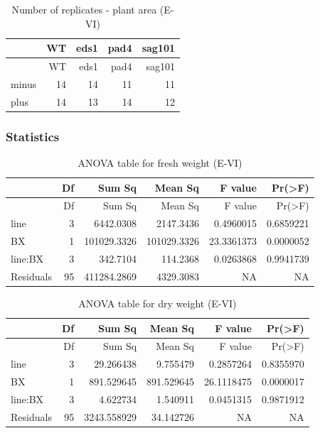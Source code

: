 \documentclass[
  10pt,
]{article}
\begin{document}
\begin{longtable}[]{@{}lrrrr@{}}
\caption{Number of replicates - plant area (E-VI)}\tabularnewline
\toprule\noalign{}
& WT & eds1 & pad4 & sag101 \\
\midrule\noalign{}
\endfirsthead
\toprule\noalign{}
& WT & eds1 & pad4 & sag101 \\
\midrule\noalign{}
\endhead
\bottomrule\noalign{}
\endlastfoot
minus & 14 & 14 & 11 & 11 \\
plus & 14 & 13 & 14 & 12 \\
\end{longtable}

\subsubsection{Statistics}\label{statistics-4}

\begin{longtable}[]{@{}lrrrrr@{}}
\caption{ANOVA table for fresh weight (E-VI)}\tabularnewline
\toprule\noalign{}
& Df & Sum Sq & Mean Sq & F value & Pr(\textgreater F) \\
\midrule\noalign{}
\endfirsthead
\toprule\noalign{}
& Df & Sum Sq & Mean Sq & F value & Pr(\textgreater F) \\
\midrule\noalign{}
\endhead
\bottomrule\noalign{}
\endlastfoot
line & 3 & 6442.0308 & 2147.3436 & 0.4960015 & 0.6859221 \\
BX & 1 & 101029.3326 & 101029.3326 & 23.3361373 & 0.0000052 \\
line:BX & 3 & 342.7104 & 114.2368 & 0.0263868 & 0.9941739 \\
Residuals & 95 & 411284.2869 & 4329.3083 & NA & NA \\
\end{longtable}

\begin{longtable}[]{@{}lrrrrr@{}}
\caption{ANOVA table for dry weight (E-VI)}\tabularnewline
\toprule\noalign{}
& Df & Sum Sq & Mean Sq & F value & Pr(\textgreater F) \\
\midrule\noalign{}
\endfirsthead
\toprule\noalign{}
& Df & Sum Sq & Mean Sq & F value & Pr(\textgreater F) \\
\midrule\noalign{}
\endhead
\bottomrule\noalign{}
\endlastfoot
line & 3 & 29.266438 & 9.755479 & 0.2857264 & 0.8355970 \\
BX & 1 & 891.529645 & 891.529645 & 26.1118475 & 0.0000017 \\
line:BX & 3 & 4.622734 & 1.540911 & 0.0451315 & 0.9871912 \\
Residuals & 95 & 3243.558929 & 34.142726 & NA & NA \\
\end{longtable}
\end{document}
